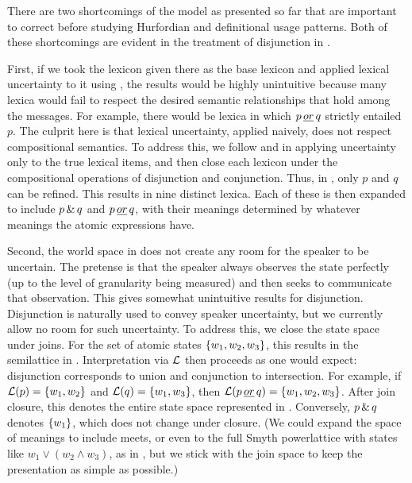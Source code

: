 \documentclass[12pt,twoside]{article}
\renewcommand{\_}{\textbf{\textunderscore\hspace{-4pt}\textunderscore\hspace{-3pt}\textunderscore\hspace{-4pt}\textunderscore}\hspace{0.5pt}}			%
\begin{document}
There are two shortcomings of the model as presented so far that are
important to correct before studying Hurfordian and definitional usage
patterns. Both of these shortcomings are evident in the treatment of
disjunction in .

First, if we took the lexicon given there as the base lexicon and
applied lexical uncertainty to it using ,
the results would be highly unintuitive because many lexica would fail
to respect the desired semantic relationships that hold among the
messages. For example, there would be lexica in which $p\,\emph{or}\,q$ strictly
entailed $p$. The culprit here is that lexical uncertainty, applied
naively, does not respect compositional semantics.  To address this,
we follow \citet{bergen-levy-goodman:2014} and
\citet{levy-bergen-goodman:2014SALT} in applying uncertainty only to
the true lexical items, and then close each lexicon under the
compositional operations of disjunction and conjunction. Thus, in
, only $p$ and $q$ can be refined.  This results
in nine distinct lexica.  Each of these is then expanded to include
$p\,\&\,q$ and $p\,\emph{or}\,q$, with their meanings determined by whatever
meanings the atomic expressions have.  

Second, the world space in  does not create any
room for the speaker to be uncertain. The pretense is that the speaker
always observes the state perfectly (up to the level of granularity
being measured) and then seeks to communicate that observation. This
gives somewhat unintuitive results for disjunction. Disjunction is
naturally used to convey speaker uncertainty, but we currently allow
no room for such uncertainty.  To address this, we close the state
space under joins.  For the set of atomic states
$\left\{ w_{1}, w_{2}, w_{3} \right\}$, this results in the semilattice in
. Interpretation via $\mathcal{L}$ then proceeds as one
would expect: disjunction corresponds to union and conjunction to
intersection. For example, if $\mathcal{L}(p) = \left\{ w_{1}, w_{2} \right\}$ and
$\mathcal{L}(q) = \left\{ w_{1}, w_{3} \right\}$, then
$\mathcal{L}(p\,\emph{or}\,q) = \left\{ w_{1}, w_{2}, w_{3} \right\}$.  After join closure, this
denotes the entire state space represented in
. Conversely, $p\,\&\,q$ denotes $\left\{ w_{1} \right\}$,
which does not change under closure. (We could expand the space of
meanings to include meets, or even to the full Smyth powerlattice with
states like $w_{1}{\vee} (w_{2}{\wedge} w_{3})$, as in
\citealt{levy-pollard:2001}, but we stick with the join space to keep
the presentation as simple as possible.)
\end{document}
